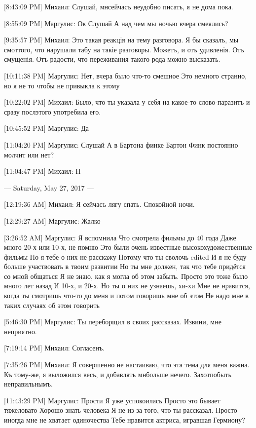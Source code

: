 \documentclass{article}
\newcommand{\yat}{{\fontencoding{X2}\selectfont\cyryat}} %
\begin{document}
{[8:43:09 PM] Михаил:
Слушай, мн\yat сейчасъ неудобно писать, я не дома пока.

[8:55:09 PM] Маргулис:
Ок
 Слушай
 А над чем мы ночью вчера смеялись?

[9:35:57 PM] Михаил:
Это такая реакція на тему разговора. Я бы сказалъ, мы см оттого, что нарушали табу на такіе разговоры. Можетъ, и отъ удивленія.
 Отъ смущенія. Отъ радости, что переживания такого рода можно высказать.

[10:11:38 PM] Маргулис:
Нет, вчера было что-то смешное
 Это немного странно, но я не то чтобы не привыкла к этому

[10:22:02 PM] Михаил:
Было, что ты указала у себя на какое-то слово-паразитъ и сразу посл\yat этого употребила его.

[10:45:52 PM] Маргулис:
Да

[11:04:20 PM] Маргулис:
Слушай
 А в Бартона финке Бартон Финк постоянно молчит или нет?

[11:04:47 PM] Михаил:
Н

--- Saturday, May 27, 2017 ---

[12:19:36 AM] Михаил:
Я сейчасъ лягу спать. Спокойной ночи.

[12:29:27 AM] Маргулис:
Жалко

[3:26:52 AM] Маргулис:
Я вспомнила
 Что смотрела фильмы до 40 года
 Даже много
 20-х или 10-х, не помню
 Это были очень известные высокохудожественные фильмы
 Но я тебе о них не расскажу
 Потому что ты сволочь
edited 
И я не буду больше участвовать в твоим развитии
 Но ты мне должен, так что тебе придётся со мной общаться
 Я не знаю, как я могла об этом забыть.
 Просто это тоже было много лет назад
 И 10-х, и 20-х.
 Но ты о них не узнаешь, хи-хи
 Мне не нравится, когда ты смотришь что-то до меня и потом говоришь мне об этом
 Не надо мне в таких случаях об этом говорить

[5:46:30 PM] Маргулис:
Ты переборщил в своих рассказах. Извини, мне неприятно.

[7:19:14 PM] Михаил:
Согласенъ.

[7:35:26 PM] Михаил:
Я совершенно не настаиваю, что эта тема для меня важна. Къ тому-же, я выложился весь, и добавлять мн\yat больше нечего.
 Захот побыть неправильнымъ.

[11:43:29 PM] Маргулис:
Прости
 Я уже успокоилась
 Просто это бывает тяжеловато
 Хорошо знать человека
 Я не из-за того, что ты рассказал. Просто иногда мне не хватает одиночества
 Тебе нравится актриса, игравшая Гермиону?

}
\end{document}
